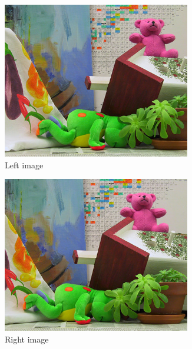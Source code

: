 \begin{figure}[ht]
  \centering
  \begin{subfigure}[t]{0.3\textwidth}
    \centering\includegraphics[width=0.9\textwidth]{figures/tedl.jpg}
    \caption{Left image \label{fig:apted_l}}
  \end{subfigure}\hspace{0.5cm}
  \begin{subfigure}[t]{0.3\textwidth}
    \centering\includegraphics[width=0.9\textwidth]{figures/tedr}
    \caption{Right image\label{fig:apted_r}}
  \end{subfigure}\hspace{0.5cm}
  \begin{subfigure}[t]{0.3\textwidth}

\end{subfigure}
\end{figure}
